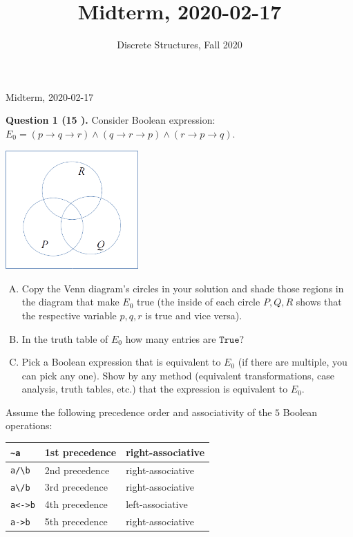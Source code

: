 \documentclass[jou]{apa6}
\title{Midterm, 2020-02-17}
\author{Discrete Structures, Fall 2020}
\affiliation{RBS}
\begin{document}
\thispagestyle{empty}

\twocolumn
{\Large Midterm, 2020-02-17}


{\bf Question 1 (15 \textperthousand{}).} 
Consider Boolean expression:\\
$E_0 = (p \rightarrow q \rightarrow r) \wedge (q \rightarrow r \rightarrow p) \wedge (r \rightarrow p \rightarrow q)$. 
\begin{center}
\includegraphics[width=2in]{midterm/circles.png}
\end{center}

\begin{enumerate}[(A)]
\item Copy the Venn diagram's circles in your solution and shade those regions in the diagram that make $E_0$ true
(the inside of each circle $P,Q,R$ shows that the respective variable $p,q,r$ is true and vice versa). 
\item In the truth table of $E_0$ how many entries are $\mathtt{True}$? 
\item Pick a Boolean expression that is equivalent to $E_0$ (if there are multiple, you can pick any one). 
Show by any method (equivalent transformations, case analysis, truth tables, etc.) that
the expression is equivalent to $E_0$. 
\end{enumerate}


Assume the following precedence order and associativity of the $5$ Boolean operations: 

\begin{tabular}{|l|l|l|} \hline
{\tt \textasciitilde{}a} & 1st precedence & right-associative \\ \hline
{\tt a/\textbackslash{}b} & 2nd precedence & right-associative \\ \hline
{\tt a\textbackslash{}/b} & 3rd precedence & right-associative \\ \hline
{\tt a<->b} & 4th precedence & left-associative \\ \hline
{\tt a->b} & 5th precedence & right-associative \\ \hline
\end{tabular}
\end{document}
